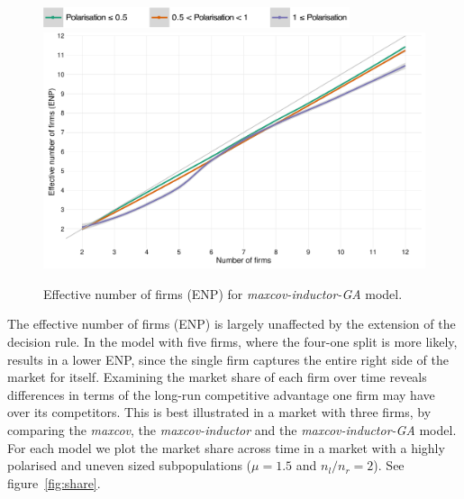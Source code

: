 \documentclass[preprint, 12pt]{elsarticle}
\begin{document}
\begin{figure}[ht!]
	\centering
	\includegraphics[width=90mm]{Graphics/legend_pol.pdf}
	\includegraphics[width=\textwidth]{Graphics/fig622a.pdf}
	\caption{Effective number of firms (ENP) for \emph{maxcov-inductor-GA} model.}
	\label{fig:enp_miga}
\end{figure}

The effective number of firms (ENP) is largely unaffected by the extension of the decision rule. In the model with five firms, where the four-one split is more likely, results in a lower ENP, since the single firm captures the entire right side of the market for itself. Examining the market share of each firm over time reveals differences in terms of the long-run competitive advantage one firm may have over its competitors. This is best illustrated in a market with three firms, by comparing the \emph{maxcov}, the \emph{maxcov-inductor} and the \emph{maxcov-inductor-GA} model. For each model we plot the market share across time in a market with a highly polarised and uneven sized subpopulations ($\mu=1.5$ and $n_l/n_r = 2$). See figure~\ref{fig:share}. 
\end{document}
